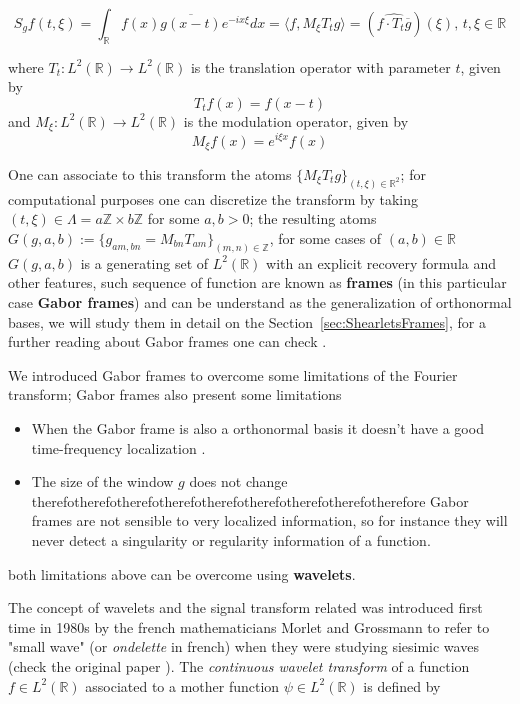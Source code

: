 $$
S_gf(t,\xi)=\int_{\mathbb{R}} f(x)\overline{g(x-t)}e^{-ix\xi}dx=\langle f,M_{\xi}T_tg\rangle = (\widehat{f\cdot T_t\overline{g}})(\xi)\text{,  } t,\xi\in\mathbb{R}
$$

where $T_t:L^2(\mathbb{R})\longrightarrow L^2(\mathbb{R})$ is the translation operator with parameter $t$, given by 
$$
T_tf(x)=f(x-t)
$$
and $M_{\xi}:L^2(\mathbb{R})\longrightarrow L^2(\mathbb{R})$ is the modulation operator, given by 
$$
M_{\xi} f(x)=e^{i\xi x}f(x)
$$

\bigskip 

One can associate to this transform the atoms $\{M_{\xi}T_tg\}_{(t,\xi)\in\mathbb{R}^2}$; for computational purposes one can discretize the transform by taking $(t,\xi)\in\Lambda=a\mathbb{Z}\times b\mathbb{Z}$ for some $a,b>0$; the resulting atoms $G(g,a,b):=\{g_{am,bn}=M_{bn}T_{am}\}_{(m,n)\in\mathbb{Z}}$, for some cases of $(a,b)\in\mathbb{R}$ $G(g,a,b)$ is a generating set of $L^2(\mathbb{R})$ with an explicit recovery formula and other features, such sequence of function are known as \textbf{frames} (in this particular case \textbf{Gabor frames}) and can be understand as the generalization of orthonormal bases, we will study them in detail on the Section~\ref{sec:ShearletsFrames}, for a further reading about Gabor frames one can check \cite{Gabor}.

\bigskip

We introduced Gabor frames to overcome some limitations of the Fourier transform; Gabor frames also present some limitations
\begin{itemize}
\item When the Gabor frame is also a orthonormal basis it doesn't have a good time-frequency localization \cite{Gabor}.
\item The size of the window $g$ does not change therefotherefotherefotherefotherefotherefotherefotherefotherefore Gabor frames are not sensible to very localized information, so for instance they will never detect a singularity or regularity information of a function.
\end{itemize} 
both limitations above can be overcome using \textbf{wavelets}.

\bigskip 

The concept of wavelets and the signal transform related was introduced first time 
in 1980s by the french mathematicians Morlet and Grossmann to refer to "small wave" (or \textit{ondelette} in french) when they were studying siesimic waves (check the original paper \cite{Grossman}). The \textit{continuous wavelet transform} of a function $f\in L^2(\mathbb{R})$ associated to a mother function $\psi\in L^2(\mathbb{R})$ is defined by 

